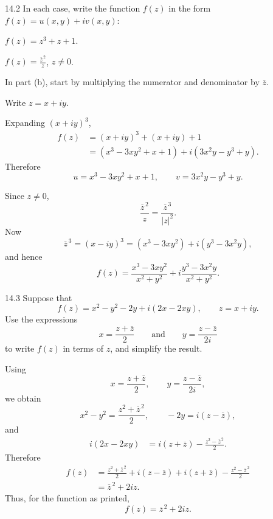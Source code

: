 \documentclass[11pt,oneside]{article}
\begin{document}
\begin{exercise}{14.2}
In each case, write the function \(f(z)\) in the form \(f(z)=u(x, y)+iv(x, y)\):
\begin{exercisesubparts}
    \item \(f(z)=z^3+z+1\).
    \item \(\displaystyle f(z)=\frac{\overline z^{\,2}}{z}\), \(z\ne0\).
\end{exercisesubparts}
\begin{suggestion}
In part (b), start by multiplying the numerator and denominator by \(\overline z\).
\end{suggestion}
\end{exercise}

\begin{solution}
Write \(z=x+iy\).
\begin{exercisesubparts}
    \item Expanding \((x+iy)^3\),
    \[
    \begin{aligned}
        f(z)
        &=(x+iy)^3+(x+iy)+1\\
        &=(x^3-3xy^2+x+1)+i(3x^2y-y^3+y).
    \end{aligned}
    \]
    Therefore
    \[
        \boxed{u=x^3-3xy^2+x+1,
        \qquad v=3x^2y-y^3+y}.
    \]

    \item Since \(z\ne0\),
    \[
        \frac{\overline z^{\,2}}{z}
        =\frac{\overline z^{\,3}}{|z|^2}.
    \]
    Now
    \[
        \overline z^{\,3}
        =(x-iy)^3
        =(x^3-3xy^2)+i(y^3-3x^2y),
    \]
    and hence
    \[
        \boxed{
        f(z)=\frac{x^3-3xy^2}{x^2+y^2}
        +i\frac{y^3-3x^2y}{x^2+y^2}
        }.
    \]
\end{exercisesubparts}
\end{solution}

\begin{exercise}{14.3}
Suppose that
\[
    f(z)=x^2-y^2-2y+i(2x-2xy),
    \qquad z=x+iy.
\]
Use the expressions
\[
    x=\frac{z+\overline z}{2}
    \qquad\text{and}\qquad
    y=\frac{z-\overline z}{2i}
\]
to write \(f(z)\) in terms of \(z\), and simplify the result.
\end{exercise}

\begin{solution}
Using
\[
    x=\frac{z+\overline z}{2},
    \qquad
    y=\frac{z-\overline z}{2i},
\]
we obtain
\[
    x^2-y^2=\frac{z^2+\overline z^{\,2}}2,
    \qquad
    -2y=i(z-\overline z),
\]
and
\[
\begin{aligned}
    i(2x-2xy)
    &=i(z+\overline z)-\frac{z^2-\overline z^{\,2}}2.
\end{aligned}
\]
Therefore
\[
\begin{aligned}
    f(z)
    &=\frac{z^2+\overline z^{\,2}}2+i(z-\overline z)
      +i(z+\overline z)-\frac{z^2-\overline z^{\,2}}2\\
    &=\overline z^{\,2}+2iz.
\end{aligned}
\]
Thus, for the function as printed,
\[
    \boxed{f(z)=\overline z^{\,2}+2iz}.
\]
\end{solution}
\end{document}
